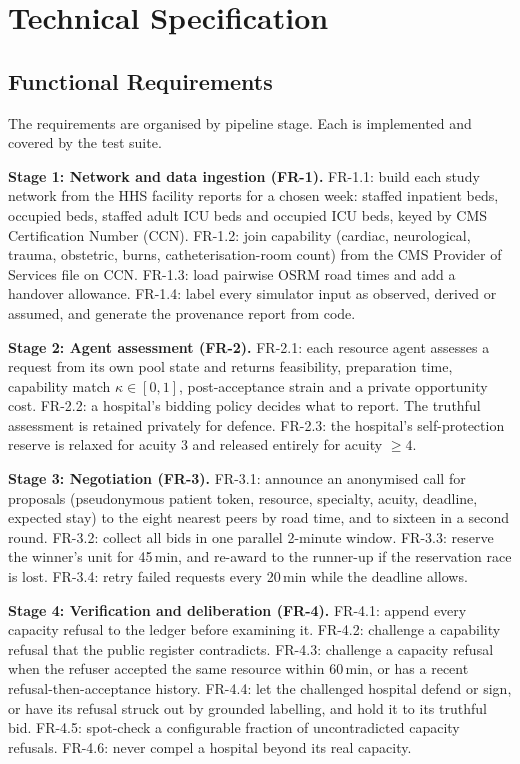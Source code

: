 \section{Technical Specification}
\label{sec:spec}

\subsection{Functional Requirements}
The requirements are organised by pipeline stage. Each is implemented and covered by the test suite.

\textbf{Stage 1: Network and data ingestion (FR-1).}
FR-1.1: build each study network from the HHS facility reports \cite{hhs_capacity_dataset} for a chosen week: staffed inpatient beds, occupied beds, staffed adult ICU beds and occupied ICU beds, keyed by CMS Certification Number (CCN).
FR-1.2: join capability (cardiac, neurological, trauma, obstetric, burns, catheterisation-room count) from the CMS Provider of Services file \cite{cms_pos} on CCN.
FR-1.3: load pairwise OSRM road times \cite{luxen2011osrm} and add a handover allowance.
FR-1.4: label every simulator input as observed, derived or assumed, and generate the provenance report from code.

\textbf{Stage 2: Agent assessment (FR-2).}
FR-2.1: each resource agent assesses a request from its own pool state and returns feasibility, preparation time, capability match $\kappa\in[0,1]$, post-acceptance strain and a private opportunity cost.
FR-2.2: a hospital's bidding policy decides what to report. The truthful assessment is retained privately for defence.
FR-2.3: the hospital's self-protection reserve is relaxed for acuity 3 and released entirely for acuity $\ge4$.

\textbf{Stage 3: Negotiation (FR-3).}
FR-3.1: announce an anonymised call for proposals (pseudonymous patient token, resource, specialty, acuity, deadline, expected stay) to the eight nearest peers by road time, and to sixteen in a second round.
FR-3.2: collect all bids in one parallel 2-minute window.
FR-3.3: reserve the winner's unit for 45\,min, and re-award to the runner-up if the reservation race is lost.
FR-3.4: retry failed requests every 20\,min while the deadline allows.

\textbf{Stage 4: Verification and deliberation (FR-4).}
FR-4.1: append every capacity refusal to the ledger before examining it.
FR-4.2: challenge a capability refusal that the public register contradicts.
FR-4.3: challenge a capacity refusal when the refuser accepted the same resource within 60\,min, or has a recent refusal-then-acceptance history.
FR-4.4: let the challenged hospital defend or sign, or have its refusal struck out by grounded labelling, and hold it to its truthful bid.
FR-4.5: spot-check a configurable fraction of uncontradicted capacity refusals.
FR-4.6: never compel a hospital beyond its real capacity.


